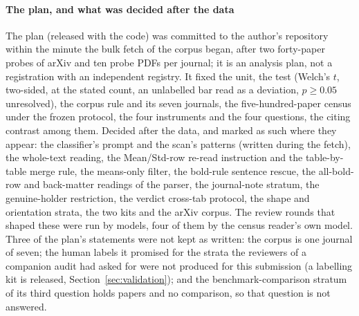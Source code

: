\documentclass[preprint,review,12pt]{elsarticle}
\begin{document}
\paragraph{The plan, and what was decided after the data} The plan (released with the code) was committed to the author's repository within the minute the bulk fetch of the corpus began, after two forty-paper probes of arXiv and ten probe PDFs per journal; it is an analysis plan, not a registration with an independent registry. It fixed the unit, the test (Welch's $t$, two-sided, at the stated count, an unlabelled bar read as a deviation, $p \geq 0.05$ unresolved), the corpus rule and its seven journals, the five-hundred-paper census under the frozen protocol, the four instruments and the four questions, the citing contrast among them. Decided after the data, and marked as such where they appear: the classifier's prompt and the scan's patterns (written during the fetch), the whole-text reading, the Mean/Std-row re-read instruction and the table-by-table merge rule, the means-only filter, the bold-rule sentence rescue, the all-bold-row and back-matter readings of the parser, the journal-note stratum, the genuine-holder restriction, the verdict cross-tab protocol, the shape and orientation strata, the two kits and the arXiv corpus. The review rounds that shaped these were run by models, four of them by the census reader's own model. Three of the plan's statements were not kept as written: the corpus is one journal of seven; the human labels it promised for the strata the reviewers of a companion audit had asked for were not produced for this submission (a labelling kit is released, Section~\ref{sec:validation}); and the benchmark-comparison stratum of its third question holds \nKcComparison{} papers and no comparison, so that question is not answered.
\end{document}

